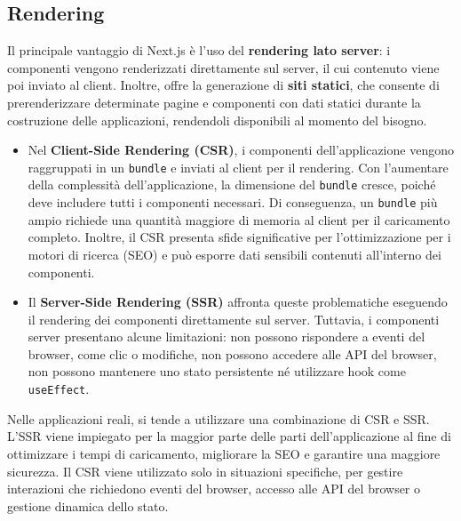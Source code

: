\documentclass[target=bach,aauheader=,style=]{thud}
\begin{document}
\subsection{Rendering}
Il principale vantaggio di Next.js è l'uso del \textbf{rendering lato server}: i componenti vengono renderizzati direttamente sul server, il cui contenuto viene poi inviato al client. Inoltre, offre la generazione di \textbf{siti statici}, che consente di prerenderizzare determinate pagine e componenti con dati statici durante la costruzione delle applicazioni, rendendoli disponibili al momento del bisogno.

\begin{itemize}
    \item Nel \textbf{Client-Side Rendering (CSR)}, i componenti dell'applicazione vengono raggruppati in un \texttt{bundle} e inviati al client per il rendering. Con l'aumentare della complessità dell'applicazione, la dimensione del \texttt{bundle} cresce, poiché deve includere tutti i componenti necessari. Di conseguenza, un \texttt{bundle} più ampio richiede una quantità maggiore di memoria al client per il caricamento completo. Inoltre, il CSR presenta sfide significative per l'ottimizzazione per i motori di ricerca (SEO) e può esporre dati sensibili contenuti all'interno dei componenti.

    \item Il \textbf{Server-Side Rendering (SSR)} affronta queste problematiche eseguendo il rendering dei componenti direttamente sul server. Tuttavia, i componenti server presentano alcune limitazioni: non possono rispondere a eventi del browser, come clic o modifiche, non possono accedere alle API del browser, non possono mantenere uno stato persistente né utilizzare hook come \texttt{useEffect}.
\end{itemize}

Nelle applicazioni reali, si tende a utilizzare una combinazione di CSR e SSR. L'SSR viene impiegato per la maggior parte delle parti dell'applicazione al fine di ottimizzare i tempi di caricamento, migliorare la SEO e garantire una maggiore sicurezza. Il CSR viene utilizzato solo in situazioni specifiche, per gestire interazioni che richiedono eventi del browser, accesso alle API del browser o gestione dinamica dello stato.
\end{document}
